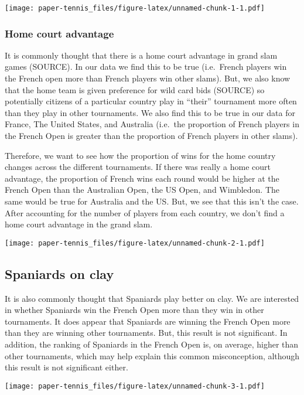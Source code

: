 \documentclass[]{article}
\begin{document}
\texttt{[image: paper-tennis\_files/figure-latex/unnamed-chunk-1-1.pdf]}

\hypertarget{home-court-advantage}{%
\subsubsection{Home court advantage}\label{home-court-advantage}}

It is commonly thought that there is a home court advantage in grand
slam games (SOURCE). In our data we find this to be true (i.e.~French
players win the French open more than French players win other slams).
But, we also know that the home team is given preference for wild card
bids (SOURCE) so potentially citizens of a particular country play in
``their'' tournament more often than they play in other tournaments. We
also find this to be true in our data for France, The United States, and
Australia (i.e.~the proportion of French players in the French Open is
greater than the proportion of French players in other slams).

Therefore, we want to see how the proportion of wins for the home
country changes across the different tournaments. If there was really a
home court advantage, the proportion of French wins each round would be
higher at the French Open than the Australian Open, the US Open, and
Wimbledon. The same would be true for Australia and the US. But, we see
that this isn't the case. After accounting for the number of players
from each country, we don't find a home court advantage in the grand
slam.

\texttt{[image: paper-tennis\_files/figure-latex/unnamed-chunk-2-1.pdf]}

\hypertarget{spaniards-on-clay}{%
\subsection{Spaniards on clay}\label{spaniards-on-clay}}

It is also commonly thought that Spaniards play better on clay. We are
interested in whether Spaniards win the French Open more than they win
in other tournaments. It does appear that Spaniards are winning the
French Open more than they are winning other tournaments. But, this
result is not significant. In addition, the ranking of Spaniards in the
French Open is, on average, higher than other tournaments, which may
help explain this common misconception, although this result is not
significant either.

\texttt{[image: paper-tennis\_files/figure-latex/unnamed-chunk-3-1.pdf]}
\end{document}
